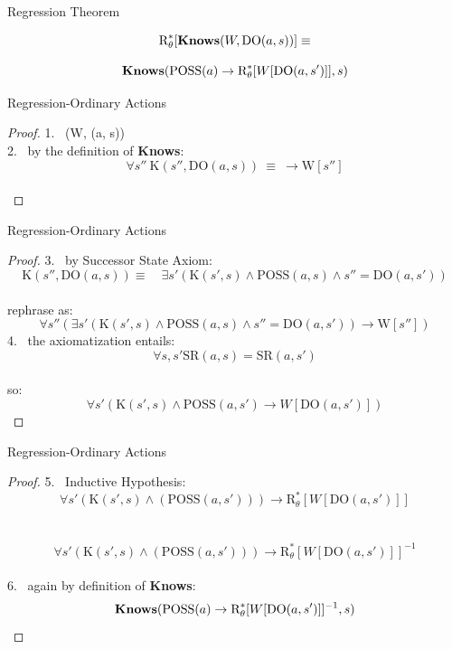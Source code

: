 \begin{frame}{Regression Theorem}
    \begin{theorem}
        \[ \text{R}^*_{\theta}[\textbf{Knows}(W, \text{DO}(a, s))] \equiv \]
            
        \[ \textbf{Knows}(\text{POSS}(a) \rightarrow \text{R}^*_{\theta}[W[\text{DO}(a, s')]], s) \]
    \end{theorem}    
\end{frame}

\begin{frame}{Regression-Ordinary Actions}
    \begin{proof}  
       1. \ \knows(W, (a, s)) \\
       2. \ by the definition of \textbf{Knows}: \ \[ \forall s'' \  \text{K}(s'', \text{DO}(a, s)) \ \equiv \ \rightarrow \text{W}[s''] \] \\
    \end{proof} 
\end{frame} 

\begin{frame}{Regression-Ordinary Actions}
    \begin{proof}  
       3. \ by Successor State Axiom: \[ \text{K}(s'', \text{DO}(a, s)) \equiv \quad \exists s'(\text{K}(s',s) \land \text{POSS}(a, s) \land s'' = \text{DO}(a, s'))\] \\
       rephrase as: \[ \forall s''(\exists s'(\text{K}(s',s) \land \text{POSS}(a, s) \land s'' = \text{DO}(a, s')) \rightarrow \text{W}[s''])  \]
       4. \ the axiomatization entails: \[ \forall s,s' \text{SR}(a, s) = \text{SR}(a, s') \] \\
       so: \[ \forall s'(\text{K}(s',s) \land \text{POSS}(a, s') \rightarrow W[\text{DO}(a, s')]) \]
    \end{proof} 
\end{frame}

\begin{frame}{Regression-Ordinary Actions}

    \begin{proof}  
       5. \ Inductive Hypothesis: \[ \forall s'(\text{K}(s',s) \land (\text{POSS}(a, s'))) \rightarrow \text{R}^*_{\theta}[W[\text{DO}(a, s')]] \] \\
          \ \[ \forall s'(\text{K}(s',s) \land (\text{POSS}(a, s'))) \rightarrow \text{R}^*_{\theta}[W[\text{DO}(a, s')]]^{-1} \] \\
       
       6. \ again by definition of \textbf{Knows}: \  \[ \textbf{Knows}(\text{POSS}(a) \rightarrow \text{R}^*_{\theta}[W[\text{DO}(a, s')]]^{-1}, s) \]
    \end{proof} 

\end{frame}



